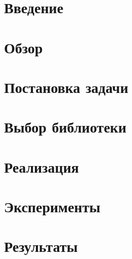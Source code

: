 



\usepackage{caption}
\usepackage{listings}
\usepackage{comment}

\newcommand{\TODO}[1]{\textcolor{red}{#1}}

\newcommand{\OCaml}{\textsc{OCaml}}
\newcommand{\Haskell}{\textsc{Haskell}}
\newcommand{\Scala}{\textsc{Scala}}
\newcommand{\Javascript}{\textsc{Javascript}}
\newcommand{\Bucklescript}{\textsc{Bucklescript}}
\newcommand{\ReasonML}{\textsc{ReasonML}}
\newcommand{\ReScript}{\textsc{ReScript}}
\newcommand{\Jsoo}{\textsc{Js\_of\_ocaml}}
\newcommand{\Kotlin}{\textsc{Kotlin}}
\newcommand{\GCC}{\textsc{GCC}}
\newcommand{\Parsec}{\textsc{Parsec}}
\newcommand{\JSON}{\textsc{JSON}}




\maketitle
\setcounter{tocdepth}{2}
\tableofcontents

\section{Введение}
\label{sec:intro}



\section{Обзор}
\label{sec:overview}



\section{Постановка задачи}
\label{sec:task}


\section{Выбор библиотеки}
\label{sec:libs}


\section{Реализация}
\label{sec:approach}



\section{Эксперименты}
\label{sec:experiments}



\section{Результаты}
\label{sec:conclusion}


\nocite{*}
\setmonofont[Mapping=tex-text]{CMU Typewriter Text}



